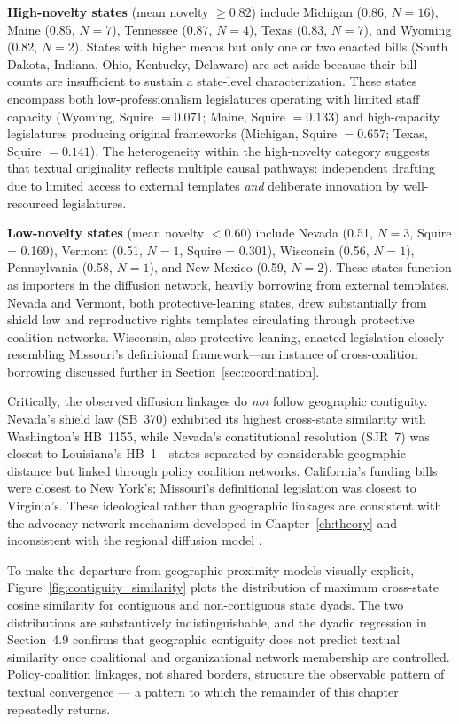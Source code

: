 \textbf{High-novelty states} (mean novelty $\geq 0.82$) include Michigan (0.86, $N=16$), Maine (0.85, $N=7$), Tennessee (0.87, $N=4$), Texas (0.83, $N=7$), and Wyoming (0.82, $N=2$). States with higher means but only one or two enacted bills (South Dakota, Indiana, Ohio, Kentucky, Delaware) are set aside because their bill counts are insufficient to sustain a state-level characterization. These states encompass both low-professionalism legislatures operating with limited staff capacity (Wyoming, Squire $= 0.071$; Maine, Squire $= 0.133$) and high-capacity legislatures producing original frameworks (Michigan, Squire $= 0.657$; Texas, Squire $= 0.141$). The heterogeneity within the high-novelty category suggests that textual originality reflects multiple causal pathways: independent drafting due to limited access to external templates \textit{and} deliberate innovation by well-resourced legislatures.

\textbf{Low-novelty states} (mean novelty $< 0.60$) include Nevada (0.51, $N = 3$, Squire = 0.169), Vermont (0.51, $N = 1$, Squire = 0.301), Wisconsin (0.56, $N = 1$), Pennsylvania (0.58, $N = 1$), and New Mexico (0.59, $N = 2$). These states function as importers in the diffusion network, heavily borrowing from external templates. Nevada and Vermont, both protective-leaning states, drew substantially from shield law and reproductive rights templates circulating through protective coalition networks. Wisconsin, also protective-leaning, enacted legislation closely resembling Missouri's definitional framework---an instance of cross-coalition borrowing discussed further in Section~\ref{sec:coordination}.

Critically, the observed diffusion linkages do \textit{not} follow geographic contiguity. Nevada's shield law (SB~370) exhibited its highest cross-state similarity with Washington's HB~1155, while Nevada's constitutional resolution (SJR~7) was closest to Louisiana's HB~1---states separated by considerable geographic distance but linked through policy coalition networks. California's funding bills were closest to New York's; Missouri's definitional legislation was closest to Virginia's. These ideological rather than geographic linkages are consistent with the advocacy network mechanism developed in Chapter~\ref{ch:theory} and inconsistent with the regional diffusion model \parencite{walkerDiffusionInnovationsAmerican1969}.

To make the departure from geographic-proximity models visually explicit, Figure~\ref{fig:contiguity_similarity} plots the distribution of maximum cross-state cosine similarity for contiguous and non-contiguous state dyads. The two distributions are substantively indistinguishable, and the dyadic regression in Section~4.9 confirms that geographic contiguity does not predict textual similarity once coalitional and organizational network membership are controlled. Policy-coalition linkages, not shared borders, structure the observable pattern of textual convergence — a pattern to which the remainder of this chapter repeatedly returns.

